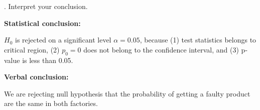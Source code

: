 \documentclass[12pt, oneside]{report}\usepackage[]{graphicx}\usepackage[]{color}
\begin{document}
. Interpret your conclusion. \newline

{\bf Statistical conclusion:} \newline

$H_0$ is rejected on a significant level $\alpha = 0.05$, because (1) test statistics belongs to critical region, (2) $p_0 = 0$ does not belong to the confidence interval, and (3) p-value is less than 0.05. \newline 

{\bf Verbal conclusion:} \newline

We are rejecting null hypothesis that the probability of getting a faulty product are the same in both factories.
\end{document}
